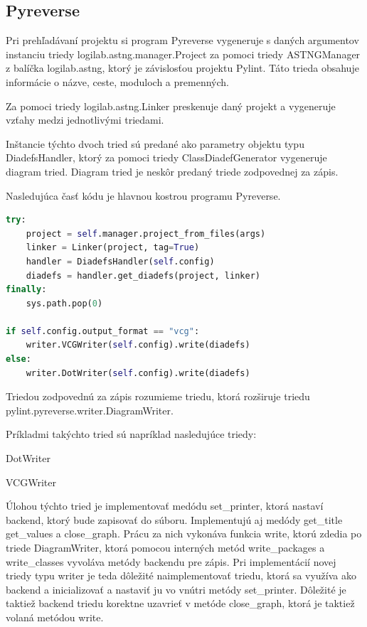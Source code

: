 \documentclass[11pt,oneside,final]{fithesis2}
\begin{document}
	\subsection{Pyreverse}
	Pri prehľadávaní projektu si program Pyreverse vygeneruje s daných argumentov instanciu triedy logilab.astng.manager.Project za pomoci triedy ASTNGManager z balíčka logilab.astng, ktorý je závislosťou projektu Pylint.
	Táto trieda obsahuje informácie o názve, ceste, moduloch a premenných.
	
		Za pomoci triedy logilab.astng.Linker preskenuje daný projekt a vygeneruje vzťahy medzi jednotlivými triedami.
	
		Inštancie týchto dvoch tried sú predané ako parametry objektu typu DiadefsHandler, ktorý za pomoci triedy ClassDiadefGenerator vygeneruje diagram tried. Diagram tried je neskôr predaný triede zodpovednej za zápis.
		
		Nasledujúca časť kódu je hlavnou kostrou programu Pyreverse.
		
\begin{lstlisting}[language=python]	
try:
    project = self.manager.project_from_files(args)
    linker = Linker(project, tag=True)
    handler = DiadefsHandler(self.config)
    diadefs = handler.get_diadefs(project, linker)
finally:
    sys.path.pop(0)

if self.config.output_format == "vcg":
	writer.VCGWriter(self.config).write(diadefs)
else:
    writer.DotWriter(self.config).write(diadefs)
\end{lstlisting}
		
		
		Triedou zodpovednú za zápis rozumieme triedu, ktorá rozširuje triedu pylint.pyreverse.writer.DiagramWriter.
		
			Príkladmi takýchto tried sú napríklad nasledujúce triedy:
			    \begin{list}{•}{}
					\item DotWriter
					\item VCGWriter
    			\end{list}
    			
    	Úlohou týchto tried je implementovať medódu set\_printer, ktorá nastaví backend, ktorý bude zapisovať do súboru.
    	Implementujú aj medódy get\_title get\_values a close\_graph.
    	Prácu za nich vykonáva funkcia write, ktorú zdedia po triede DiagramWriter, ktorá pomocou interných metód write\_packages a write\_classes vyvoláva metódy backendu pre zápis. Pri implementácií novej triedy typu writer je teda dôležité naimplementovať triedu, ktorá sa využíva ako backend a inicializovať a nastaviť ju vo vnútri metódy set\_printer.
    	Dôležité je taktiež backend triedu korektne uzavrieť v metóde close\_graph, ktorá je taktiež volaná metódou write.
 
\end{document}
